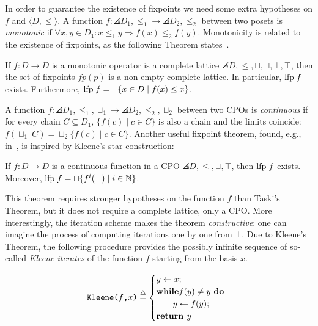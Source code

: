 In order to guarantee the existence of fixpoints we need some extra hypotheses
on $f$ and $\langle D, \leq \rangle$.
A function $f: \angles{D_1, \leq_1} \rightarrow \angles{D_2, \leq_2}$ between two
posets is \emph{monotonic} if
$\forall x,y \in D_1: x \leq_1 y \Longrightarrow f(x) \leq_2 f(y)$.
Monotonicity is related to the existence of fixpoints, as the following
Theorem states~\cite{tarski1955lattice}.

\begin{theorem}
If $f: D \rightarrow D$ is a monotonic operator is a complete lattice
$\angles{D, \leq, \sqcup, \sqcap, \bot, \top}$, then the set of fixpoints
$fp(p)$ is a non-empty complete lattice.
In particular, $\textrm{lfp}\; f$ exists.
Furthermore, $\textrm{lfp}\; f = \sqcap \{x \in D \;|\; f(x) \leq x\}$.
\end{theorem}

A function $f: \angles{D_1, \leq_1, \sqcup_1} \rightarrow \angles{D_2, \leq_2, \sqcup_2}$
between two CPOs is \emph{continuous} if for every chain $C \subseteq D_1$,
$\{f(c) \;|\; c \in C\}$ is also a chain and the limits coincide:
$f(\sqcup_1 \; C) = \sqcup_2 \{ f(c) \;|\; c \in C\}$.
Another useful fixpoint theorem, found, e.g., in~\cite{cousot1977abstract},
is inspired by Kleene\cite{kleene1952introduction}'s star construction:

\begin{theorem}
If $f: D \rightarrow D$ is a continuous function in a CPO
$\angles{D, \leq, \sqcup, \top}$, then $\textrm{lfp}\; f$ exists.
Moreover, $\textrm{lfp}\; f = \sqcup \{f^i(\bot) \;|\; i \in \mathbb{N}\}$.
\end{theorem}

This theorem requires stronger hypotheses on the function $f$ than Taski's Theorem,
but it does not require a complete lattice, only a CPO.
More interestingly, the iteration scheme makes the theorem \emph{constructive}:
one can imagine the process of computing iterations one by one from $\bot$.
Due to Kleene's Theorem, the following procedure provides the possibly
infinite sequence of so-called \emph{Kleene iterates} of the function $f$
starting from the basis $x$.

\[ \textrm{ \texttt{Kleene($f$,$x$)}} \overset{\triangle}{=}
\begin{cases}
y \leftarrow x;\\
\textrm{\textbf{while}} f(y) \neq y \textrm{ \textbf{do}}\\
\;\;\;\;\;\;\;y \leftarrow f(y);\\
\textrm{\textbf{return }} y \\
\end{cases}\]

